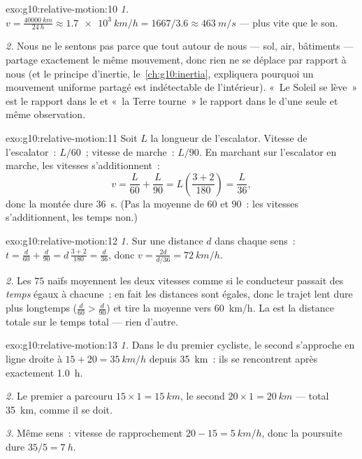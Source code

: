 \begin{solution}{exo:g10:relative-motion:10}
\emph{1.} $v = \frac{\qty{40000}{km}}{\qty{24}{h}}
\approx \qty{1.7e3}{km/h} = 1667/3.6 \approx \qty{463}{m/s}$ ---
plus vite que le son.

\emph{2.} Nous ne le sentons pas parce que tout autour de nous ---
sol, air, bâtiments --- partage exactement le même mouvement, donc
rien ne se déplace par rapport à nous (et le principe d'inertie,
le~\cref{ch:g10:inertia}, expliquera pourquoi un mouvement uniforme
partagé est indétectable de l'intérieur). «~Le Soleil se lève~» est
le rapport dans le  et «~la Terre tourne~» le
rapport dans le  d'une seule et même
observation.
\end{solution}

\begin{solution}{exo:g10:relative-motion:11}
Soit $L$ la longueur de l'escalator. Vitesse de l'escalator~: $L/60$~;
vitesse de marche~: $L/90$. En marchant sur l'escalator en marche, les
vitesses s'additionnent~:
\[
v = \frac{L}{60} + \frac{L}{90} = L\left(\frac{3 + 2}{180}\right)
= \frac{L}{36},
\]
donc la montée dure \qty{36}{s}. (Pas la moyenne de $60$ et $90$~: les
vitesses s'additionnent, les temps non.)
\end{solution}

\begin{solution}{exo:g10:relative-motion:12}
\emph{1.} Sur une distance $d$ dans chaque sens~:
$t = \frac{d}{60} + \frac{d}{90} = d\,\frac{3 + 2}{180} = \frac{d}{36}$,
donc $v = \frac{2d}{d/36} = \qty{72}{km/h}$.

\emph{2.} Les $75$ naïfs moyennent les deux vitesses comme si le
conducteur passait des \emph{temps} égaux à chacune~; en fait les
distances sont égales, donc le trajet lent dure plus longtemps
($\frac{d}{60} > \frac{d}{90}$) et tire la moyenne vers
\qty{60}{km/h}. La  est la distance totale sur
le temps total --- rien d'autre.
\end{solution}

\begin{solution}{exo:g10:relative-motion:13}
\emph{1.} Dans le  du premier cycliste, le second s'approche
en ligne droite à $15 + 20 = \qty{35}{km/h}$ depuis \qty{35}{km}~: ils
se rencontrent après exactement \qty{1.0}{h}.

\emph{2.} Le premier a parcouru $15 \times 1 = \qty{15}{km}$, le
second $20 \times 1 = \qty{20}{km}$ --- total \qty{35}{km}, comme il
se doit.

\emph{3.} Même sens~: vitesse de rapprochement
$20 - 15 = \qty{5}{km/h}$, donc la poursuite dure $35/5 = \qty{7}{h}$.
\end{solution}


